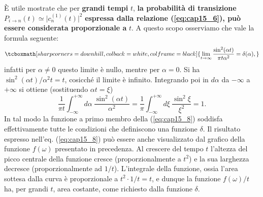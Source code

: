 \documentclass[a4paper,12pt,oneside]{book}
\begin{document}
È utile mostrate che per \textbf{grandi tempi} $t$, \textbf{la probabilità di transizione} $P_{i\rightarrow n} (t) \simeq \vert c_n ^{(1)} (t) \vert ^2$ \textbf{espressa dalla relazione (\ref{eq:cap15_6}), può essere considerata proporzionale a } $t$. A questo scopo osserviamo che vale la formula seguente:
	\begin{equation}
		\tcboxmath[sharp corners=downhill, colback=white, colframe=black]{
			\lim _{t \rightarrow \infty} \frac{\sin ^2 (\alpha t)}{\pi t \alpha ^2} = \delta (\alpha),
			}
	\label{eq:cap15_8}
	\end{equation}
infatti per $\alpha \neq 0$ questo limite è nullo, mentre per  $\alpha = 0$. Si ha $\sin ^2 (\alpha t)/\alpha ^2 t = t$, cosicché il limite è infinito. Integrando poi in $d \alpha$ da $-\infty$ a $+\infty$ si ottiene (sostituendo $\alpha t = \xi$)
	\begin{equation}
		\frac{1}{\pi t}\int _{-\infty} ^{+\infty} d\alpha \ \frac{\sin ^2 (\alpha t)}{ \alpha ^2} = \frac{1}{\pi}\int _{-\infty} ^{+\infty} d\xi \ \frac{\sin ^2 \xi}{ \xi ^2}=1. 
	\end{equation}
In tal modo la funzione a primo membro della (\ref{eq:cap15_8}) soddisfa effettivamente tutte le condizioni che definiscono una funzione $\delta$. Il risultato espresso nell'eq. (\ref{eq:cap15_8}) può essere anche visualizzato dal grafico della funzione $f(\omega)$ presentato in precedenza. Al crescere del tempo $t$ l'altezza del picco centrale della funzione cresce (proporzionalmente a $t^2$) e la sua larghezza decresce (proporzionalmente ad $1/t$). L'integrale della funzione, ossia l'area sottesa dalla curva è proporzionale a $t^2\cdot 1/t =t$, e dunque la funzione $f(\omega)/t$ ha, per grandi $t$, area costante, come richiesto dalla funzione $\delta$.\\
\end{document}
